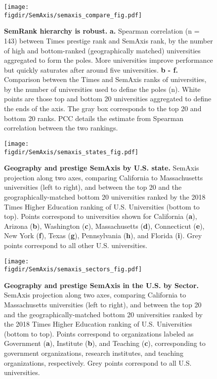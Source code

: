 \documentclass[12pt]{article} %
\def\figdir{../Figs}
\begin{document}
%
%
\begin{figure}[hp!]
    \centering
    \label{fig:supp:semaxis_compare}
    \texttt{[image: \\figdir/SemAxis/semaxis\_compare\_fig.pdf]}
    \caption{
        \textbf{SemRank hierarchy is robust.}
        \textbf{a.} Spearman correlation (n = 143) between Times prestige rank and SemAxis rank, by the number of high and bottom-ranked (geographically matched) universities aggregated to form the poles.
        More universities improve performance but quickly saturates after around five universities.
        \textbf{b - f.} Comparison between the Times and SemAxis ranks of universities, by the number of universities used to define the poles (n).
        White points are those top and bottom 20 universities aggregated to define the ends of the axis.
        The gray box corresponds to the top 20 and bottom 20 ranks.
          PCC details the estimate from Spearman correlation between the two rankings.
    }
\end{figure}


%
%
\begin{figure}[hp!]
    \centering
    \label{fig:supp:semaxis_states}
    \texttt{[image: \\figdir/SemAxis/semaxis\_states\_fig.pdf]}
    \caption{
        \textbf{Geography and prestige SemAxis by U.S. state.}
        SemAxis projection along two axes, comparing California to Massachusetts universities (left to right), and between the top 20 and the geographically-matched bottom 20 universities ranked by the 2018 Times Higher Education ranking of U.S. Universities (bottom to top).
        Points correspond to universities shown for California (\textbf{a}), Arizona (\textbf{b}), Washington (\textbf{c}), Massachusetts (\textbf{d}), Connecticut (\textbf{e}), New York (\textbf{f}), Texas (\textbf{g}), Pennsylvania (\textbf{h}), and Florida (\textbf{i}).
        Grey points correspond to all other U.S. universities.
    }
\end{figure}


%
%
\begin{figure}[hp!]
    \centering
    \label{fig:supp:semaxis_sectors}
    \texttt{[image: \\figdir/SemAxis/semaxis\_sectors\_fig.pdf]}
    \caption{
        \textbf{Geography and prestige SemAxis in the U.S. by Sector.}
        SemAxis projection along two axes, comparing California to Massachusetts universities (left to right), and between the top 20 and the geographically-matched bottom 20 universities ranked by the 2018 Times Higher Education ranking of U.S. Universities (bottom to top).
        Points correspond to organizations labeled as Government (\textbf{a}), Institute (\textbf{b}), and Teaching (\textbf{c}), corresponding to government organizations, research institutes, and teaching organizations, respectively.
        Grey points correspond to all U.S. universities.
    }
\end{figure}




\clearpage
\printbibliography{}
\end{document}
